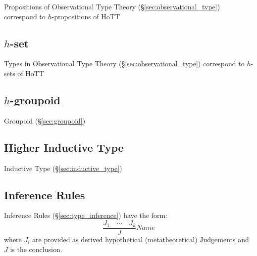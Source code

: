 {Propositions of Observational Type Theory
(\S\ref{sec:observational_type}) correspond to $h$-propositions of HoTT



\subsection{$h$-set}\label{sec:h_set}

Types in Observational Type Theory (\S\ref{sec:observational_type})
correspond to $h$-sets of HoTT



\subsection{$h$-groupoid}\label{sec:h_groupoid}

Groupoid (\S\ref{sec:groupoid})



\subsection{Higher Inductive Type}\label{sec:higher_inductive_type}

\fist Inductive Type (\S\ref{sec:inductive_type})




\subsection{Inference Rules}\label{sec:homotopy_rules}

Inference Rules (\S\ref{sec:type_inference}) have the form:
\[
  \frac{J_1 \quad \cdots \quad J_k} {J} Name
\]
where $J_i$ are provided as derived hypothetical (metatheoretical)
Judgements and $J$ is the conclusion.

}
